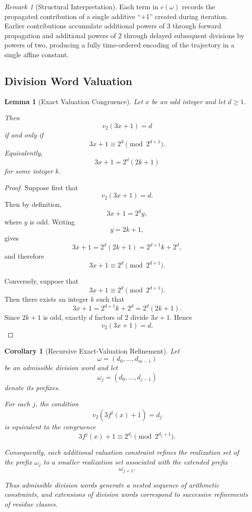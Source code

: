 \documentclass[12pt, oneside]{article}
\numberwithin{equation}{section}
\theoremstyle{definition}
\theoremstyle{plain}
\newtheorem{lemma}[theorem]{Lemma}
\newtheorem{corollary}[theorem]{Corollary}
\theoremstyle{remark}
\newtheorem*{remark}{Remark}
\begin{document}
\begin{remark}[Structural Interpretation]
Each term in $c(\omega)$ records the propagated contribution of a
single additive ``+1'' created during iteration. Earlier contributions
accumulate additional powers of $3$ through forward propagation and
additional powers of $2$ through delayed subsequent divisions by powers
of two, producing a fully time-ordered encoding of the trajectory in a
single affine constant.
\end{remark}

\subsection{Division Word Valuation}

\begin{lemma}[Exact Valuation Congruence]
\label{lem:exact-valuation-congruence}
Let \(x\) be an odd integer and let \(d\ge1\).

Then
\[
v_2(3x+1)=d
\]
if and only if
\[
3x+1\equiv 2^d \pmod{2^{d+1}}.
\]
Equivalently,
\[
3x+1 = 2^d(2k+1)
\]
for some integer \(k\).
\end{lemma}

\begin{proof}
Suppose first that
\[
v_2(3x+1)=d.
\]
Then by definition,
\[
3x+1 = 2^d y,
\]
where \(y\) is odd. Writing
\[
y=2k+1,
\]
gives
\[
3x+1 = 2^d(2k+1) = 2^{d+1}k+2^d,
\]
and therefore
\[
3x+1 \equiv 2^d \pmod{2^{d+1}}.
\]

Conversely, suppose that
\[
3x+1 \equiv 2^d \pmod{2^{d+1}}.
\]
Then there exists an integer \(k\) such that
\[
3x+1 = 2^{d+1}k+2^d = 2^d(2k+1).
\]
Since \(2k+1\) is odd, exactly \(d\) factors of \(2\) divide \(3x+1\). Hence
\[
v_2(3x+1)=d.
\]
\end{proof}

\begin{corollary}[Recursive Exact-Valuation Refinement]
\label{cor:recursive-refinement}
Let
\[
\omega=(d_0,\dots,d_{m-1})
\]
be an admissible division word and let
\[
\omega_j=(d_0,\dots,d_{j-1})
\]
denote its prefixes.

For each \(j\), the condition
\[
v_2(3f^j(x)+1)=d_j
\]
is equivalent to the congruence
\[
3f^j(x)+1 \equiv 2^{d_j} \pmod{2^{d_j+1}}.
\]

Consequently, each additional valuation constraint refines the realization
set of the prefix \(\omega_j\) to a smaller realization set associated with
the extended prefix
\[
\omega_{j+1}.
\]

Thus admissible division words generate a nested sequence of arithmetic
constraints, and extensions of division words correspond to successive
refinements of residue classes.
\end{corollary}
\end{document}
